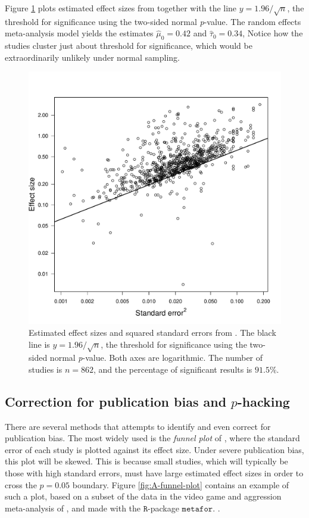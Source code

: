 Figure \ref{fig:motyl} plots estimated effect sizes from \textcite{Motyl2017-dx} together with the line $y=1.96/\sqrt{n}$, the threshold for significance using the two-sided normal \emph{p}-value. The random effects meta-analysis model yields the estimates $\hat{\mu}_{0}=0.42$ and $\hat{\tau}_{0}=0.34$, Notice how the studies cluster just about threshold for significance, which would be extraordinarily unlikely under normal sampling.
\begin{figure}
\noindent \begin{centering}
\includegraphics[scale=0.5]{figures/motyl}
\par\end{centering}
\caption{\label{fig:motyl}Estimated effect sizes and squared standard errors from \textcite{Motyl2017-dx}. The black line is $y=1.96/\sqrt{n}$, the threshold for significance using the two-sided normal \emph{p}-value. Both axes are logarithmic. The number of studies is $n=862$, and the percentage of significant results is $91.5\%$.}
\end{figure}
\subsection{Correction for publication bias and $p$-hacking}

There are several methods that attempts to identify and even correct for publication bias. The most widely used is the \emph{funnel plot} of \textcite{Egger1998-kj}, where the standard error of each study is plotted against its effect size. Under severe publication bias, this plot will be skewed. This is because small studies, which will typically be those with high standard errors, must have large estimated effect sizes in order to cross the $p=0.05$ boundary. Figure \ref{fig:A-funnel-plot} contains an example of such a plot, based on a subset of the data in the video game and aggression meta-analysis of \textcite{Anderson2010-ki}, and made with the $\mathtt{R}$-package $\mathtt{metafor}$. \parencite{viechtbauer_conducting_2010}.

